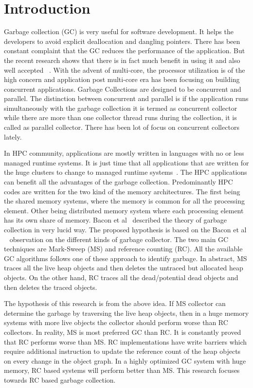 \section{Introduction}
Garbage collection (GC) is very useful for software development. It helps the developers to avoid explicit deallocation and dangling pointers. There has been constant complaint that the GC reduces the performance of the application. But the recent research shows that there is in fact much benefit in using it and also well accepted ~\cite{Butters2007}. With the advent of multi-core, the processor utilization is of the high concern and application post multi-core era has been focusing on building concurrent applications. Garbage Collections are designed to be concurrent and parallel. The distinction between concurrent and parallel is if the application runs simultaneously with the garbage collection it is termed as concurrent collector while there are more than one collector thread runs during the collection, it is called as parallel collector. There has been lot of focus on concurrent collectors lately. 

In HPC community, applications are mostly written in languages with no or less managed runtime systems. It is just time that all applications that are written for the huge clusters to change to managed runtime systems~\cite{Endo,APPELSGC}. The HPC applications can benefit all the advantages of the garbage collection. Predominantly HPC codes are written for the two kind of the memory architectures. The first being the shared memory systems, where the memory is common for all the processing element. Other being distributed memory system where each processing element has its own share of memory. Bacon et al~\cite{BaconUTGC} described the theory of garbage collection in very lucid way. The proposed hypothesis is based on the Bacon et al ~\cite{BaconUTGC} observation on the different kinds of garbage collector. The two main GC techniques are Mark-Sweep (MS) and reference counting (RC). All the available GC algorithms follows one of these approach to identify garbage. In abstract, MS traces all the live heap objects and then deletes the untraced but allocated heap objects. On the other hand, RC traces all the dead/potential dead objects and then deletes the traced objects. 

The hypothesis of this research is from the above idea. If MS collector can determine the garbage by traversing the live heap objects, then in a huge memory systems with more live objects the collector should perform worse than RC collectors. In reality, MS is most preferred GC than RC. It is constantly proved that RC performs worse than MS. RC implementations have write barriers which require additional instruction to update the reference count of the heap objects on every change in the object graph.
In a highly optimized GC system with huge memory, RC based systems will perform better than MS. This research focuses towards RC based garbage collection. 

